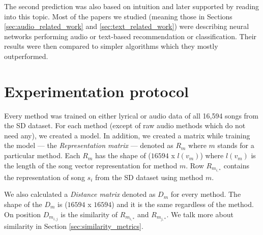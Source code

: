 The second prediction was also based on intuition and later supported by reading into this topic. Most of the papers we studied (meaning those in Sections \ref{sec:audio_related_work} and \ref{sec:text_related_work}) were describing neural networks performing audio or text-based recommendation or classification. Their results were then compared to simpler algorithms which they mostly outperformed. 

\section{Experimentation protocol}
Every method was trained on either lyrical or audio data of all 16,594 songs from the SD dataset.
For each method (except of raw audio methods which do not need any), we created a model. In addition, we created a matrix while training the model --- the \textit{Representation matrix} --- denoted as  $R_m$ where $m$ stands for a particular method. Each $R_m$ has the shape of ($16594$ x $l(v_m) $) where $l(v_m)$ is the length of the song vector representation for method $m$. Row $R_{m_{i,*}}$ contains the representation of song $s_i$ from the SD dataset using method $m$. 

We also calculated a \textit{Distance matrix} denoted as $D_m$ for every method. The shape of the $D_m$ is ($16594 $ x $ 16594$) and it is the same regardless of the method. On position $D_{m_{i,j}}$ is the similarity of $R_{m_{i,*}}$ and $R_{m_{j,*}}$. We talk more about similarity in Section \ref{sec:similarity_metrics}. \\

